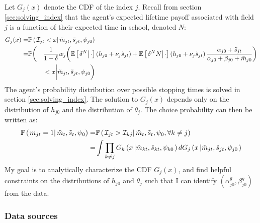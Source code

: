 \documentclass[11 pt]{article}
\newcommand{\pr}[1]{\left( #1 \right)}
\newcommand{\ce}[2]{\left[\left. #1 \right\vert #2 \right]}
\newcommand{\cls}[2]{\left. #1 \right\vert #2}
\newcommand{\crs}[2]{#1 \left\vert #2 \right.}
\newcommand{\study}{m} %
\newcommand{\pass}{s}
\newcommand{\pstates}{\tilde{\study}_{jt}, \tilde{\pass}_{jt}, \psi_{j0}}
\newcommand*{\ks}[1][t]{\tilde{\pass}_{j #1}}
\begin{document}
Let $G_j (x)$ denote the CDF of the index $j$. Recall from section \ref{sec:solving_index} that the agent's expected lifetime payoff associated with field $j$ is a function of their expected time in school, denoted $N$:
\begin{alignat*}{3}
    G_j(x) =& \PP \pr{\cls{\mathcal{I}_{jt} < x}{\pstates}} \span \span
    \\
    =&
    \PP \bigg(
        &&\frac{1}{1 - \delta} w_j
        \bigg(
            \EE \ce{\delta^N}{\cdot} \pr{h_{j0} + \nu_j \ks}
            + 
            \EE \ce{\delta^N N}{\cdot} \pr{h_{j0} + \nu_j \ks}
            \frac{\alpha_{j0} + \ks}{\alpha_{j0} + \beta_{j0} + \tilde{\study}_{j0}}
        \bigg) \\
    &&&< x \bigg\vert \pstates \bigg)
\end{alignat*}
The agent's probability distribution over possible stopping times is solved in section \ref{sec:solving_index}.
The solution to $G_j(x)$ depends only on the distribution of $h_{j0}$ and the distribution of $\theta_j$. 
The choice probability can then be written as:
\begin{align*}
    \PP \pr{\cls{
        m_{jt} = 1
    }{\tilde{\study}_t, \tilde{\pass}_t, \psi_0}}
    =& 
    \PP \pr{\cls{
        \mathcal{I}_{jt} > \mathcal{I}_{kj}
    }{\tilde{\study}_t, \tilde{\pass}_t, \psi_0, \forall k \neq j}}
    \\
    =& 
    \int \prod_{k \neq j} 
    G_k \pr{
        \crs{x}{\tilde{\study}_{kt}, \tilde{\pass}_{kt}, \psi_{k0}}
    } d G_j \pr{
        \crs{x}{\tilde{\study}_{jt}, \tilde{\pass}_{jt}, \psi_{j0}}
    }
\end{align*}
My goal is to analytically characterize the CDF $G_j (x)$, and find helpful constraints on the distributions of $h_{j0}$ and $\theta_j$ such that I can identify $(\alpha_{j0}^g, \beta_{j0}^g)$ from the data. 

\subsubsection*{Data sources}
\end{document}
